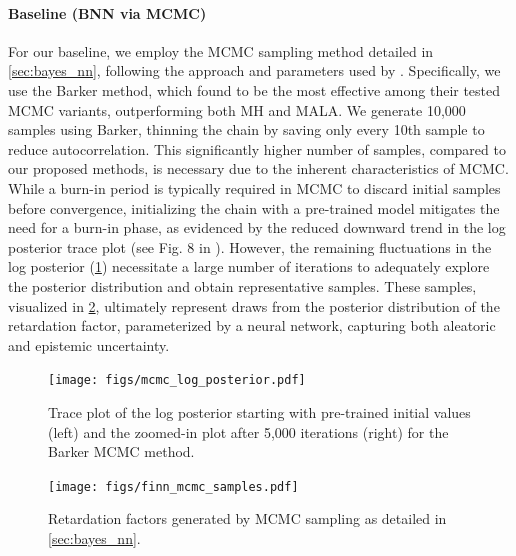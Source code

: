 \paragraph{Baseline (BNN via MCMC)}
For our baseline, we employ the MCMC sampling method detailed in \cref{sec:bayes_nn}, following the approach and parameters used by \textcite{finn}. Specifically, we use the Barker method, which \textcite{finn} found to be the most effective among their tested MCMC variants, outperforming both MH and MALA. We generate 10,000 samples using Barker, thinning the chain by saving only every 10th sample to reduce autocorrelation. This significantly higher number of samples, compared to our proposed methods, is necessary due to the inherent characteristics of MCMC. While a burn-in period is typically required in MCMC to discard initial samples before convergence, initializing the chain with a pre-trained model mitigates the need for a burn-in phase, as evidenced by the reduced downward trend in the log posterior trace plot (see Fig. 8 in \textcite{finn}). However, the remaining fluctuations in the log posterior (\cref{fig:mcmc_log_posterior}) necessitate a large number of iterations to adequately explore the posterior distribution and obtain representative samples. These samples, visualized in \cref{fig:mcmc_samples}, ultimately represent draws from the posterior distribution of the retardation factor, parameterized by a neural network, capturing both aleatoric and epistemic uncertainty.

\begin{figure}[h!]
    \centering
    \texttt{[image: figs/mcmc\_log\_posterior.pdf]}
    \caption{Trace plot of the log posterior starting with pre-trained initial values (left) and the zoomed-in plot after 5,000 iterations (right) for the Barker MCMC method.}
    \label{fig:mcmc_log_posterior}
\end{figure}

\begin{figure}[h!]
    \centering
    \texttt{[image: figs/finn\_mcmc\_samples.pdf]}
    \caption{Retardation factors generated by MCMC sampling as detailed in \cref{sec:bayes_nn}.}
    \label{fig:mcmc_samples}
\end{figure}


